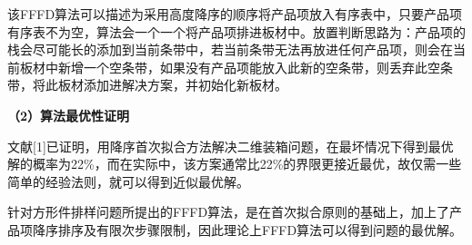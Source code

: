 \documentclass[bwprint]{gmcmthesis}
\begin{document}
    该FFFD算法可以描述为采用高度降序的顺序将产品项放入有序表中，只要产品项有序表不为空，算法会一个一个将产品项排进板材中。放置判断思路为：产品项的栈会尽可能长的添加到当前条带中，若当前条带无法再放进任何产品项，则会在当前板材中新增一个空条带，如果没有产品项能放入此新的空条带，则丢弃此空条带，将此板材添加进解决方案，并初始化新板材。

    \textbf{（2）算法最优性证明 }	
	
	文献[1]已证明，用降序首次拟合方法解决二维装箱问题，在最坏情况下得到最优解的概率为22\%，而在实际中，该方案通常比22\%的界限更接近最优，故仅需一些简单的经验法则，就可以得到近似最优解。
	
	
	针对方形件排样问题所提出的FFFD算法，是在首次拟合原则的基础上，加上了产品项降序排序及有限次步骤限制，因此理论上FFFD算法可以得到问题的最优解。

	
	
	
	
	
	
\end{document}
